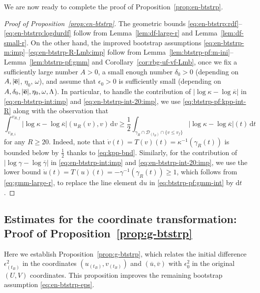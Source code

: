 \documentclass[10pt, reqno]{amsart}
\theoremstyle{definition}
\theoremstyle{remark}
\theoremstyle{conjecture}
\numberwithin{equation}{section}
\newcommand{\abs}[1]{\vert#1\vert}
\newcommand{\set}[1]{\{#1\}}
\newcommand{\ud}{\mathrm{d}}
\newcommand{\0}{\emptyset}
\newcommand{\gmm}{\gamma}
\newcommand{\dlt}{\delta}
\newcommand{\eps}{\epsilon}
\newcommand{\kpp}{\kappa}
\newcommand{\lmb}{\lambda}
\newcommand{\Lmb}{\Lambda}
\newcommand{\omg}{\omega}
\newcommand{\bfe}{{\bf e}}
\newcommand{\calD}{\mathcal D}
\newcommand{\calH}{\mathcal H}
\newcommand{\calI}{\mathcal I}
\newcommand{\dur}{\nu}
\newcommand{\dvr}{\lmb}
\newcommand{\EH}{\calH^{+}}
\newcommand{\e}{\bfe}							%
\newcommand{\NI}{\calI^{+}}						%
\newcommand{\ubg}{\overline{u}}					%
\newcommand{\vbg}{\overline{v}}					%
\newcommand{\kppbg}{\overline{\kpp}}					%
\newcommand{\gmmbg}{\overline{\gmm}}					%
\newcommand{\ebg}{\overline{\e}}					%
\begin{document}
We are now ready to complete the proof of Proposition~\ref{prop:en-btstrp}.
\begin{proof}[Proof of Proposition~\ref{prop:en-btstrp}]
The geometric bounds \eqref{eq:en-btstrp:rdf}--\eqref{eq:en-btstrp:logdurdf} follow from Lemma~\ref{lem:df-large-r} and Lemma~\ref{lem:df-small-r}. On the other hand, 
the improved bootstrap assumptions \eqref{eq:en-btstrp-m:imp}--\eqref{eq:en-btstrp-R-Lmb:imp} follow from Lemma~\ref{lem:btstrp-pf:m-ini}--Lemma~\ref{lem:btstrp-pf:gmm} and Corollary~\ref{cor:rbg-uf-vf-Lmb}, once we fix a sufficiently large number $A > 0$, a small enough number $\dlt_{0} > 0$ (depending on $A, \abs{\ebg}$, $\eta_{0}$, $\omg$), and assume that $\eps_{0} > 0$ is sufficiently small (depending on $A, \dlt_0, \abs{\ebg}, \eta_{0}, \omg, \Lmb$). In particular, to handle the contribution of $\abs{\log \kpp - \log \kppbg}$ in \eqref{eq:en-btstrp-int:imp} and \eqref{eq:en-btstrp-int-20:imp}, we use \eqref{eq:btstrp-pf:kpp-int-R} along with the observation that
\begin{equation*}
	\int_{v_{R, i}}^{v_{R, f}} \abs{\log \kpp - \log \kppbg}(u_{R}(v), v) \, \ud v
	\geq \frac{1}{2} \int_{\gmm_{R} \cap \calD_{(t_{B})} \cap  \set{v \leq v_{f}}} \abs{\log \kpp - \log \kppbg} (t)  \, \ud t
\end{equation*}
for any $R \geq 20$. Indeed, note that $\dot{v}(t) = T(v)(t) = \kpp^{-1}(\gmm_{R}(t))$ is bounded below by $\frac{1}{2}$ thanks to \eqref{eq:kpp-bnd}. Similarly, for the contribution of $\abs{\log \gmm - \log \gmmbg}$ in \eqref{eq:en-btstrp-int:imp} and \eqref{eq:en-btstrp-int-20:imp}, we use the lower bound $\dot{u}(t) = T(u)(t) = - \gmm^{-1}(\gmm_{R}(t)) \geq 1$, which follows from \eqref{eq:gmm-large-r}, to replace the line element $\ud u$ in \eqref{eq:btstrp-pf:gmm-int} by $\ud t$. \qedhere
\end{proof}

\subsection{Estimates for the coordinate transformation: Proof of Proposition~\ref{prop:g-btstrp}} \label{subsec:gauge}
Here we establish Proposition~\ref{prop:g-btstrp}, which relates the initial difference $\eps_{(t_{B})}^{2}$ in the coordinates $(u_{(t_{B})}, v_{(t_{B})})$ and $(\ubg, \vbg)$ with $\eps_{0}^{2}$ in the original $(U, V)$ coordinates.
This proposition improves the remaining bootstrap assumption \eqref{eq:en-btstrp-eps}.
\end{document}
